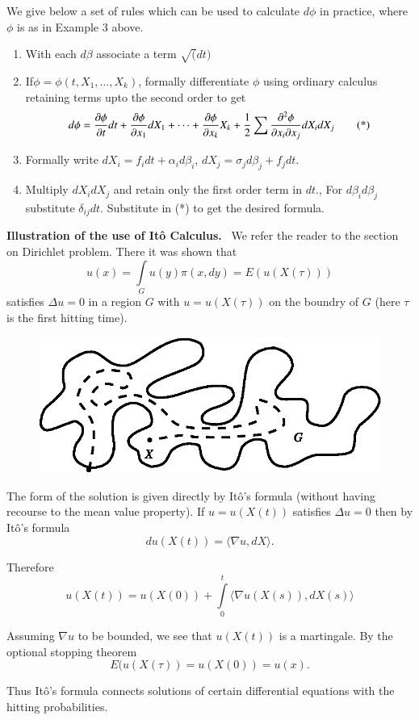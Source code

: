 We give below a set of rules which can be used to calculate $d\phi$ in
practice, where $\phi$ is as in Example 3 above.
\begin{enumerate}
\item With each $d\beta$ associate a term $\surd (dt)$

\item If\pageoriginale $\phi=\phi(t,X_{1},\ldots,X_{k})$, formally
  differentiate $\phi$ using ordinary calculus retaining terms upto
  the second order to get
\begin{equation*}
d\phi=\frac{\partial\phi}{\partial t}dt+\frac{\partial\phi}{\partial
  x_{1}}dX_{1}+\cdots+\frac{\partial \phi}{\partial x_{k}}X_{k}+\frac{1}{2}\sum
\frac{\partial^{2}\phi}{\partial x_{i}\partial x_{j}}dX_{i} dX_{j}\tag{*}
\end{equation*}

\item Formally write $dX_{i}=f_{i}dt+\alpha_{i}d\beta_{i}$,
  $dX_{j}=\sigma_{j}d\beta_{j}+f_{j}dt$.

\item Multiply $dX_{i}dX_{j}$ and retain only the first order term in
  $dt$., For $d\beta_{i}d\beta_{j}$ substitute
  $\delta_{ij}dt$. Substitute in (*) to get the desired formula.
\end{enumerate}

\noindent
{\bf Illustration of the use of It\^o Calculus.}~ We refer the reader
to the section on Dirichlet problem. There it was shown that
$$
u(x)=\int\limits_{G}u(y)\pi(x,dy)=E(u(X(\tau)))
$$
satisfies $\Delta u=0$ in a region $G$ with $u=u(X(\tau))$ on the
boundry of $G$ (here $\tau$ is the first hitting time).
\begin{figure}[H]
\centering
\includegraphics{figure/fig13.eps}
\end{figure}

The form of the solution is given directly by It\^o's formula (without
having recourse to the mean value property). If $u=u(X(t))$ satisfies
$\Delta u=0$ then by It\^o's formula
$$
du(X(t))=\langle \nabla u, dX\rangle.
$$

Therefore
$$
u(X(t))=u(X(0))+\int\limits^{t}_{0}\langle \nabla u(X(s)),dX(s)\rangle
$$\pageoriginale

Assuming $\nabla u$ to be bounded, we see that $u(X(t))$ is a
martingale. By the optional stopping theorem
$$
E(u(X(\tau))=u(X(0))=u(x).
$$

Thus It\^o's formula connects solutions of certain differential
equations with the hitting probabilities.







